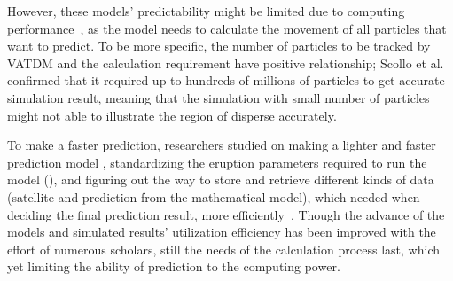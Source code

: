 \documentclass{article}
\begin{document}
\begin{doublespacing}
{  However, these models’ predictability might be limited due to computing 
  performance~\cite[p.745-746]{Tanaka2022}, as the model needs to calculate the movement of all 
  particles that want to predict. To be more specific, the number of particles to be tracked by 
  VATDM and the calculation requirement have positive relationship; Scollo et al. 
  \cite{SCOLLO2011129} confirmed that it required up to hundreds of millions of particles to get 
  accurate simulation result, meaning that the simulation with small number of particles might not 
  able to illustrate the region of disperse accurately.

  To make a faster prediction, researchers studied on making a lighter and faster prediction model
  \cite{Searcy1998}, standardizing the eruption parameters required to run the model 
  (\cite[p.7]{Webley2009}), and figuring out the way to store and retrieve different kinds of data
  (satellite and prediction from the mathematical model), which needed when deciding the final 
  prediction result, more efficiently~\cite{Sorokin2016}. Though the advance of the models and 
  simulated results' utilization efficiency has been improved with the effort of numerous scholars, 
  still the needs of the calculation process last, which yet limiting the ability of prediction to 
  the computing power.

  \fontsize{10pt}{10.5pt} 

}
\end{doublespacing}
\end{document}
